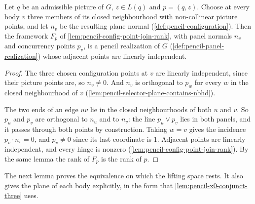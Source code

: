 \begin{lemma}
  \label{lem:pencil-config-distinct-realization}
  \leanok
  Let $q$ be an admissible picture of $G$, $z \in L(q)$ and
  $p = (q, z)$. Choose at every body $v$ three members of its closed
  neighbourhood with non-collinear picture points, and let $n_v$ be the
  resulting plane normal (\cref{def:pencil-configuration}). Then the
  framework $F_p$ of \cref{lem:pencil-config-point-join-rank}, with
  panel normals $n_v$ and concurrency points $p_v$, is a pencil
  realization of $G$ (\cref{def:pencil-panel-realization}) whose
  adjacent points are linearly independent.
\end{lemma}
\begin{proof}
  \leanok
  The three chosen configuration points at $v$ are linearly independent,
  since their picture points are, so $n_v \neq 0$. And $n_v$ is
  orthogonal to $p_w$ for every $w$ in the closed neighbourhood of $v$
  (\cref{lem:pencil-selector-plane-contains-nbhd}).

  The two ends of an edge $uv$ lie in the closed neighbourhoods of both
  $u$ and $v$. So $p_u$ and $p_v$ are orthogonal to $n_u$ and to $n_v$:
  the line $p_u \vee p_v$ lies in both panels, and it passes through
  both points by construction. Taking $w = v$ gives the incidence
  $p_v \cdot n_v = 0$, and $p_v \neq 0$ since its last coordinate is $1$.
  Adjacent points are linearly independent, and every hinge is nonzero
  (\cref{lem:pencil-config-point-join-rank}). By the same lemma the rank
  of $F_p$ is the rank of $p$.
\end{proof}

The next lemma proves the equivalence on which the lifting space rests.
It also gives the plane of each body explicitly, in the form that
\cref{lem:pencil-x0-conjunct-three} uses.

